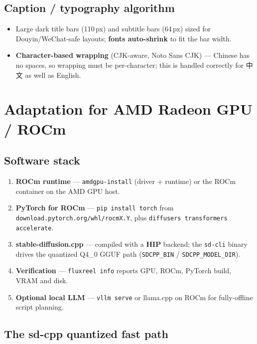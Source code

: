 \documentclass[UTF8,fontset=mac,a4paper,11pt]{ctexart}
\begin{document}
\subsection{Caption / typography algorithm}

\begin{itemize}
  \item Large dark title bars (110\,px) and subtitle bars (64\,px) sized for
        Douyin/WeChat-safe layouts; \textbf{fonts auto-shrink} to fit the
        bar width.
  \item \textbf{Character-based wrapping} (CJK-aware, Noto Sans CJK) ---
        Chinese has no spaces, so wrapping must be per-character; this is
        handled correctly for 中文 as well as English.
\end{itemize}

\section{Adaptation for AMD Radeon GPU / ROCm}

\subsection{Software stack}

\begin{enumerate}
  \item \textbf{ROCm runtime} --- \texttt{amdgpu-install} (driver + runtime)
        or the ROCm container on the AMD GPU host.
  \item \textbf{PyTorch for ROCm} ---
        \texttt{pip install torch} from
        \texttt{download.pytorch.org/whl/rocmX.Y}, plus
        \texttt{diffusers transformers accelerate}.
  \item \textbf{stable-diffusion.cpp} --- compiled with a \textbf{HIP}
        backend; the \texttt{sd-cli} binary drives the quantized Q4\_0 GGUF
        path (\texttt{SDCPP\_BIN} / \texttt{SDCPP\_MODEL\_DIR}).
  \item \textbf{Verification} --- \texttt{fluxreel info} reports GPU, ROCm,
        PyTorch build, VRAM and disk.
  \item \textbf{Optional local LLM} --- \texttt{vllm serve} or llama.cpp on
        ROCm for fully-offline script planning.
\end{enumerate}

\subsection{The sd-cpp quantized fast path}
\end{document}
